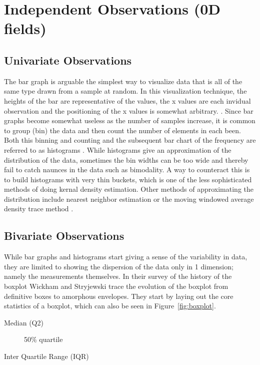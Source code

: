 \documentclass[../main.tex]{subfiles}
\begin{document}
\section{Independent Observations (0D fields)}


\subsection{Univariate Observations}

The bar graph is arguable the simplest way to visualize data that is all of the
same type drawn from a sample at random. In this visualization technique, the
heights of the bar are representative of the values, the x values are each
invidual observation and the positioning of the x values is somewhat
arbitrary. \cite{TufteVisualDIsplay, Friendly, Playfair}. Since bar
graphs become somewhat useless as the number of samples increase, it is common
to group (bin) the data and then count the number of elements in each
been. Both this binning and counting and the subsequent bar chart of the
frequency are referred to as histograms \cite{ioannidis2003}. While histograms
give an approximation of the distribution of the data, sometimes the bin widths
can be too wide and thereby fail to catch naunces in the data such as
bimodality. A way to counteract this is to build histograms with very thin
buckets, which is one of the less sophisticated methods of doing kernal density
estimation. Other methods of approximating the distribution include nearest
neighbor estimation or the  moving windowed average density trace method \cite{chambers1983}.


\subsection{Bivariate Observations}

While bar graphs and histograms start giving a sense of the variability in
data, they are limited to showing the dispersion of the data only in 1
dimension; namely the measurements themselves. In their survey of the history
of the boxplot \cite{wickham2011} Wickham and Stryjewski trace the evolution of
the boxplot from definitive boxes to amorphous envelopes.  They start by laying
out the core statistics of a boxplot, which can also be seen in Figure~\ref{fig:boxplot}.
\begin{description}

\item[Median (Q2)] 50\% quartile
\item[Inter Quartile Range (IQR)]
\end{description}
\end{document}
